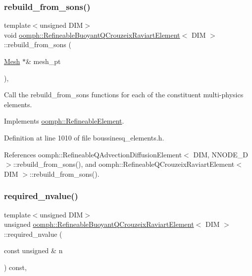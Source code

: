 \subsubsection{\texorpdfstring{rebuild\+\_\+from\+\_\+sons()}{rebuild\_from\_sons()}}
{\footnotesize\ttfamily template$<$unsigned D\+IM$>$ \\
void \hyperlink{classoomph_1_1RefineableBuoyantQCrouzeixRaviartElement}{oomph\+::\+Refineable\+Buoyant\+Q\+Crouzeix\+Raviart\+Element}$<$ D\+IM $>$\+::rebuild\+\_\+from\+\_\+sons (\begin{DoxyParamCaption}\item[{\hyperlink{classoomph_1_1Mesh}{Mesh} $\ast$\&}]{mesh\+\_\+pt }\end{DoxyParamCaption})\hspace{0.3cm}{\ttfamily [inline]}, {\ttfamily [virtual]}}



Call the rebuild\+\_\+from\+\_\+sons functions for each of the constituent multi-\/physics elements. 



Implements \hyperlink{classoomph_1_1RefineableElement_a33324be27833fa4b78279d17158215fa}{oomph\+::\+Refineable\+Element}.



Definition at line 1010 of file boussinesq\+\_\+elements.\+h.



References oomph\+::\+Refineable\+Q\+Advection\+Diffusion\+Element$<$ D\+I\+M, N\+N\+O\+D\+E\+\_\+D $>$\+::rebuild\+\_\+from\+\_\+sons(), and oomph\+::\+Refineable\+Q\+Crouzeix\+Raviart\+Element$<$ D\+I\+M $>$\+::rebuild\+\_\+from\+\_\+sons().

\mbox{\label{classoomph_1_1RefineableBuoyantQCrouzeixRaviartElement_a664008af1b7a6444cee34bd4f506c318}} 
\subsubsection{\texorpdfstring{required\+\_\+nvalue()}{required\_nvalue()}}
{\footnotesize\ttfamily template$<$unsigned D\+IM$>$ \\
unsigned \hyperlink{classoomph_1_1RefineableBuoyantQCrouzeixRaviartElement}{oomph\+::\+Refineable\+Buoyant\+Q\+Crouzeix\+Raviart\+Element}$<$ D\+IM $>$\+::required\+\_\+nvalue (\begin{DoxyParamCaption}\item[{const unsigned \&}]{n }\end{DoxyParamCaption}) const\hspace{0.3cm}{\ttfamily [inline]}, {\ttfamily [virtual]}}



